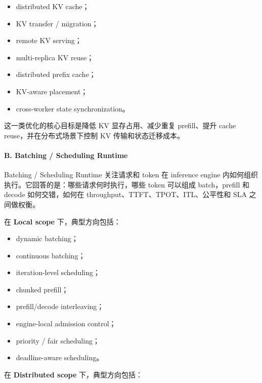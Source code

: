 \documentclass[a4paper,twocolumn,10pt]{ctexart}
\begin{document}
\begin{itemize}
\item distributed KV cache；

\item KV transfer / migration；

\item remote KV serving；

\item multi-replica KV reuse；

\item distributed prefix cache；

\item KV-aware placement；

\item cross-worker state synchronization。

\end{itemize}
这一类优化的核心目标是降低 KV 显存占用、减少重复 prefill、提升 cache reuse，并在分布式场景下控制 KV 传输和状态迁移成本。


\paragraph*{B. Batching / Scheduling Runtime}

Batching / Scheduling Runtime 关注请求和 token 在 inference engine 内如何组织执行。它回答的是：哪些请求何时执行，哪些 token 可以组成 batch，prefill 和 decode 如何交错，如何在 throughput、TTFT、TPOT、ITL、公平性和 SLA 之间做权衡。


在 \textbf{Local scope} 下，典型方向包括：


\begin{itemize}
\item dynamic batching；

\item continuous batching；

\item iteration-level scheduling；

\item chunked prefill；

\item prefill/decode interleaving；

\item engine-local admission control；

\item priority / fair scheduling；

\item deadline-aware scheduling。

\end{itemize}
在 \textbf{Distributed scope} 下，典型方向包括：
\end{document}

